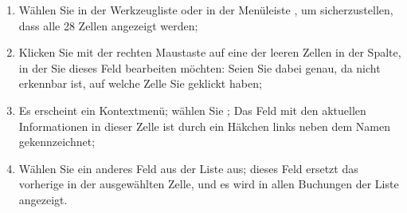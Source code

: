\begin{enumerate}
	\item Wählen Sie in der Werkzeugliste  oder in der Menüleiste , um sicherzustellen, dass alle 28 Zellen angezeigt werden;
	\item Klicken Sie mit der rechten Maustaste auf eine der leeren Zellen in der Spalte, in der Sie dieses Feld bearbeiten möchten: Seien Sie dabei genau, da nicht erkennbar ist, auf welche Zelle Sie geklickt haben;
	\item Es erscheint ein Kontextmenü; wählen Sie ; Das Feld mit den aktuellen Informationen in dieser Zelle ist durch ein Häkchen links neben dem Namen gekennzeichnet;
	\item Wählen Sie ein anderes Feld aus der Liste aus; dieses Feld ersetzt das vorherige in der ausgewählten Zelle, und es wird in allen Buchungen der Liste angezeigt.
\end{enumerate}


